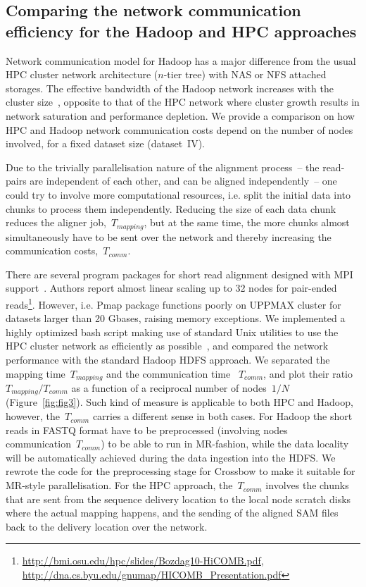 \documentclass[11pt, oneside]{article}   	%
\begin{document}
 \subsection{Comparing the network communication efficiency for the Hadoop and HPC approaches }
Network communication model for Hadoop has a major difference from the usual HPC cluster network architecture ($n$-tier tree) with NAS or NFS attached storages. The effective bandwidth of the Hadoop network increases with the cluster size~\cite{Sammer:2012}, opposite to that of the HPC network where cluster growth results in network saturation and performance depletion.
We provide a comparison on how HPC and Hadoop network communication costs depend on the number of nodes involved, for a fixed dataset size (dataset~IV).
 
Due to the trivially parallelisation nature of the alignment process~-- the read-pairs are independent of each other, and can be aligned independently~-- one could try to involve more computational resources, i.e. split the initial data into chunks to process them independently.
Reducing the size of each data chunk reduces the aligner  job,~$T_{mapping}$, but at the same time, the more chunks almost simultaneously have to be sent over the network and thereby increasing the communication costs,~$T_{comm}$.

There are several program packages for short read alignment designed with MPI support~\cite{pmap, gnumap}. Authors report almost linear scaling up to 32 nodes for pair-ended reads\footnote{\url{http://bmi.osu.edu/hpc/slides/Bozdag10-HiCOMB.pdf}, \url{http://dna.cs.byu.edu/gnumap/HICOMB_Presentation.pdf}}. However,  i.e. Pmap package functions poorly on UPPMAX cluster for  datasets larger than 20 Gbases, raising memory exceptions.
We implemented a highly optimized bash script making use of standard Unix utilities to use the  HPC cluster network as efficiently as possible~\cite{repo},  and compared the network performance with the standard Hadoop HDFS approach. We separated the mapping time~$T_{mapping}$ and the  communication time~ $T_{comm}$, and plot their ratio~$T_{mapping}/T_{comm}$ as a function of a reciprocal number of nodes~$1/N$ (Figure~\ref{fig:fig3}). 
Such kind of measure is applicable to both HPC and Hadoop, however, the~$T_{comm}$ carries a different sense in both cases. For Hadoop the short reads in FASTQ format have to be preprocessed (involving nodes communication~$T_{comm}$) to be able to run in MR-fashion, while the data locality will be automatically achieved during the data  ingestion into the HDFS. 
We rewrote the code for the preprocessing stage for Crossbow to make it suitable for MR-style parallelisation.
For the HPC approach, the~$T_{comm}$ involves the chunks that are sent from the sequence delivery location to the local node scratch disks where the actual mapping happens, and the sending of the aligned SAM files back to the delivery location over the network.
\end{document}
